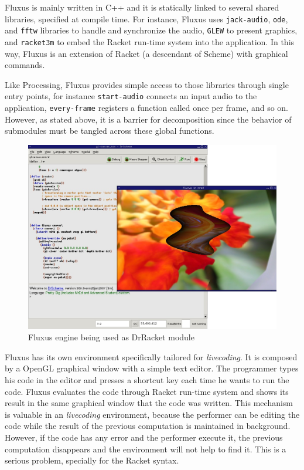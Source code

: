 Fluxus is mainly written in C++ and it is statically linked to several shared libraries, specified at compile time. For instance, Fluxus uses \texttt{jack-audio}, \texttt{ode}, and \texttt{fftw} libraries to handle and synchronize the audio, \texttt{GLEW} to present graphics, and \texttt{racket3m} to embed the Racket run-time system into the application. In this way, Fluxus is an extension of Racket (a descendant of Scheme) with graphical commands.

Like Processing, Fluxus provides simple access to those libraries through single entry points, for instance \texttt{start-audio} connects an input audio to the application, \texttt{every-frame} registers a function called once per frame, and so on. However, as stated above, it is a barrier for decomposition since the behavior of submodules must be tangled across these global functions.

\begin{figure}[!htbp]
  \centering
  \includegraphics[width=.8\textwidth]{images/fluxus}
    \caption{Fluxus engine being used as DrRacket module}
  \label{fig:fluxus}
\end{figure} 

Fluxus has its own environment specifically tailored for \textit{livecoding}. It is composed by a OpenGL graphical window with a simple text editor. The programmer types his code in the editor and presses a shortcut key each time he wants to run the code. Fluxus evaluates the code through Racket run-time system and shows its result in the same graphical window that the code was written. This mechanism is valuable in an \textit{livecoding} environment, because the performer can be editing the code while the result of the previous computation is maintained in background. However, if the code has any error and the performer execute it, the previous computation disappears and the environment will not help to find it. This is a serious problem, specially for the Racket syntax.

